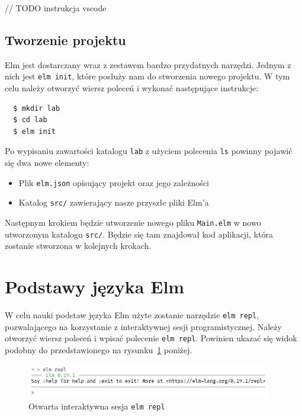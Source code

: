 \documentclass[twoside,a4paper]{report}
\begin{document}
// TODO instrukcja vscode

\subsection{Tworzenie projektu}
Elm jest dostarczany wraz z zestawem bardzo przydatnych narzędzi.
Jednym z nich jest \texttt{elm init}, które posłuży nam do stworzenia nowego projektu.
W tym celu należy otworzyć wiersz poleceń i wykonać następujące instrukcje:

\begin{lstlisting}
  $ mkdir lab
  $ cd lab
  $ elm init
\end{lstlisting}

Po wypisaniu zawartości katalogu \texttt{lab} z użyciem polecenia \texttt{ls} powinny pojawić się dwa nowe elementy:

\begin{itemize}[noitemsep,topsep=0pt]
    \item{Plik \texttt{elm.json} opisujący projekt oraz jego zależności}
    \item{Katalog \texttt{src/} zawierający nasze przyszłe pliki Elm'a}
\end{itemize}

Następnym krokiem będzie utworzenie nowego pliku \texttt{Main.elm} w nowo utworzonym katalogu \texttt{src/}.
Będzie się tam znajdował kod aplikacji, która zostanie stworzona w kolejnych krokach.

\section{Podstawy języka Elm}
W celu nauki podstaw języka Elm użyte zostanie narzędzie \texttt{elm repl}, pozwalającego na korzystanie z interaktywnej sesji programistycznej.
Należy otworzyć wiersz poleceń i wpisać polecenie \texttt{elm repl}.
Powinien ukazać się widok podobny do przedstawionego na rysunku~\ref{fig:elm_repl_output} poniżej.

\begin{figure}[H]
    \centering
    \includegraphics[width=0.95\textwidth]{img/elm_repl_output.png}
    \caption{Otwarta interaktywna sesja \texttt{elm repl}}\label{fig:elm_repl_output}
\end{figure}
\end{document}
